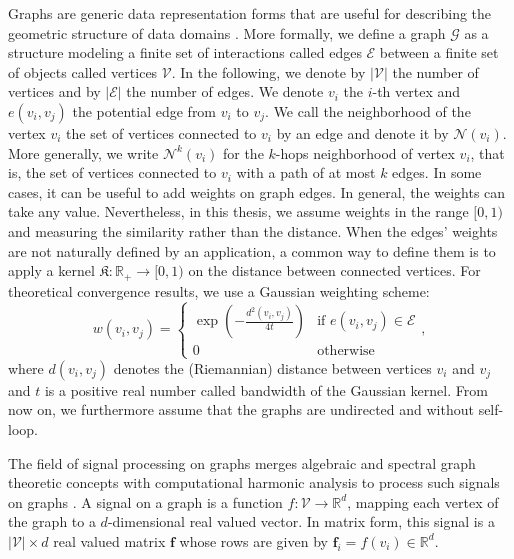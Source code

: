 \documentclass{article}
\begin{document}
Graphs are generic data representation forms that are useful for describing the geometric structure of data domains \citep{west1996introduction}. More formally, we define a graph $\mathcal{G}$ as a structure modeling a finite set of interactions called edges $\mathcal{E}$ between a finite set of objects called vertices $\mathcal{V}$. In the following, we denote by $|\mathcal{V}|$ the number of vertices and by $|\mathcal{E}|$ the number of edges. We denote $v_i$ the $i$-th vertex and $e(v_i, v_j)$ the potential edge from $v_i$ to $v_j$. We call the neighborhood of the vertex $v_i$ the set of vertices connected to $v_i$ by an edge and denote it by $\mathcal{N}(v_i)$. More generally, we write $\mathcal{N}^k(v_i)$ for the $k$-hops neighborhood of vertex $v_i$, that is, the set of vertices connected to $v_i$ with a path of at most $k$ edges. In some cases, it can be useful to add weights on graph edges. In general, the weights can take any value. Nevertheless, in this thesis, we assume weights in the range $[0, 1)$ and measuring the similarity rather than the distance. When the edges' weights are not naturally defined by an application, a common way to define them is to apply a kernel $\mathfrak{K} : \mathbb{R}_+ \to [0, 1)$ on the distance between connected vertices. For theoretical convergence results, we use a Gaussian weighting scheme:
\begin{equation}
w(v_i, v_j) =
\left\{
\begin{array}{ll}
\exp \left(- \frac{d^2(v_i, v_j)}{4t}\right) & \text{if } e(v_i, v_j) \in \mathcal{E} \\
0 & \text{otherwise}
\end{array}
\right.,
\end{equation}
where $d(v_i, v_j)$ denotes the (Riemannian) distance between vertices $v_i$ and $v_j$ and $t$ is a positive real number called bandwidth of the Gaussian kernel. From now on, we furthermore assume that the graphs are undirected and without self-loop.

The field of signal processing on graphs merges algebraic and spectral graph theoretic concepts with computational harmonic analysis to process such signals on graphs \citep{shuman2013gsp}. A signal on a graph is a function $f : \mathcal{V} \to \mathbb{R}^d$, mapping each vertex of the graph to a $d$-dimensional real valued vector. In matrix form, this signal is a $|\mathcal{V}| \times d$ real valued matrix $\boldsymbol{f}$ whose rows are given by $\boldsymbol{f}_i = f(v_i) \in \mathbb{R}^d$.
\end{document}
